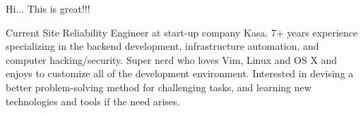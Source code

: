 

\begin{cvparagraph}

Hi... This is great!!! 

Current Site Reliability Engineer at start-up company Kasa. 7+ years experience specializing in the backend development, infrastructure automation, and computer hacking/security. Super nerd who loves Vim, Linux and OS X and enjoys to customize all of the development environment. Interested in devising a better problem-solving method for challenging tasks, and learning new technologies and tools if the need arises.
\end{cvparagraph}
